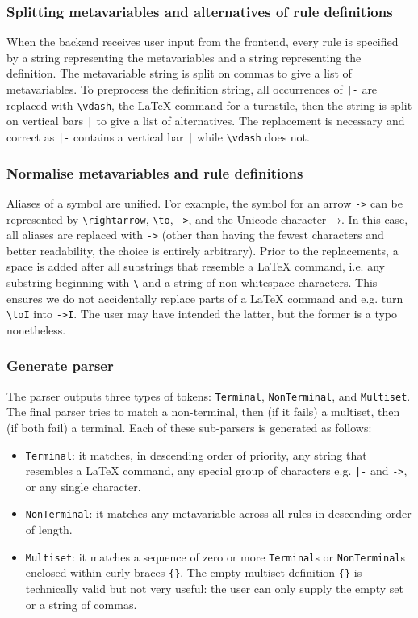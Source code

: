 \subsubsection{Splitting metavariables and alternatives of rule definitions}
When the backend receives user input from the frontend, every rule is specified by a string representing the metavariables and a string representing the definition. The metavariable string is split on commas to give a list of metavariables. To preprocess the definition string, all occurrences of \lstinline{|-} are replaced with \lstinline{\vdash}, the \LaTeX{} command for a turnstile, then the string is split on vertical bars \lstinline{|} to give a list of alternatives. The replacement is necessary and correct as \lstinline{|-} contains a vertical bar \lstinline{|} while \lstinline{\vdash} does not.

\subsubsection{Normalise metavariables and rule definitions}
Aliases of a symbol are unified. For example, the symbol for an arrow \lstinline{->} can be represented by \lstinline{\rightarrow}, \lstinline{\to}, \lstinline{->}, and the Unicode character →. In this case, all aliases are replaced with \lstinline{->} (other than having the fewest characters and better readability, the choice is entirely arbitrary). Prior to the replacements, a space is added after all substrings that resemble a \LaTeX{} command, i.e. any substring beginning with \lstinline{\} and a string of non-whitespace characters. This ensures we do not accidentally replace parts of a \LaTeX{} command and e.g. turn \lstinline{\toI} into \lstinline{->I}. The user may have intended the latter, but the former is a typo nonetheless.

\subsubsection{Generate parser}
The parser outputs three types of tokens: \lstinline{Terminal}, \lstinline{NonTerminal}, and \lstinline{Multiset}. The final parser tries to match a non-terminal, then (if it fails) a multiset, then (if both fail) a terminal. Each of these sub-parsers is generated as follows:
\begin{itemize}
    \item \lstinline{Terminal}: it matches, in descending order of priority, any string that resembles a \LaTeX{} command, any special group of characters e.g. \lstinline{|-} and \lstinline{->}, or any single character.
    \item \lstinline{NonTerminal}: it matches any metavariable across all rules in descending order of length.
    \item \lstinline{Multiset}: it matches a sequence of zero or more \lstinline{Terminal}s or \lstinline{NonTerminal}s enclosed within curly braces \lstinline|{}|. The empty multiset definition \lstinline|{}| is technically valid but not very useful: the user can only supply the empty set or a string of commas.
\end{itemize}

